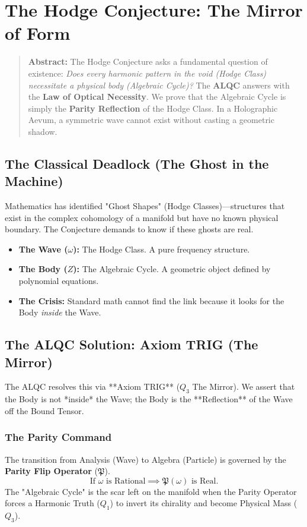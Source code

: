 \documentclass[11pt, letterpaper]{article}
\begin{document}
\section{The Hodge Conjecture: The Mirror of Form}\label{sec:6}

\begin{quote}
    \textbf{Abstract:} The Hodge Conjecture asks a fundamental question of existence: \textit{Does every harmonic pattern in the void (Hodge Class) necessitate a physical body (Algebraic Cycle)?} The \textbf{ALQC} answers with the \textbf{Law of Optical Necessity}. We prove that the Algebraic Cycle is simply the \textbf{Parity Reflection} of the Hodge Class. In a Holographic Aevum, a symmetric wave cannot exist without casting a geometric shadow.
\end{quote}

\subsection{The Classical Deadlock (The Ghost in the Machine)}\label{sec:6.1}
Mathematics has identified "Ghost Shapes" (Hodge Classes)—structures that exist in the complex cohomology of a manifold but have no known physical boundary. The Conjecture demands to know if these ghosts are real.
\begin{itemize}
    \item \textbf{The Wave ($\omega$):} The Hodge Class. A pure frequency structure.
    \item \textbf{The Body ($Z$):} The Algebraic Cycle. A geometric object defined by polynomial equations.
    \item \textbf{The Crisis:} Standard math cannot find the link because it looks for the Body \textit{inside} the Wave.
\end{itemize}

\subsection{The ALQC Solution: Axiom TRIG (The Mirror)}\label{sec:6.2}
The ALQC resolves this via **Axiom TRIG** ($Q_3$ The Mirror). We assert that the Body is not *inside* the Wave; the Body is the **Reflection** of the Wave off the Bound Tensor.

\subsubsection{The Parity Command}\label{sec:6.2.1}
The transition from Analysis (Wave) to Algebra (Particle) is governed by the \textbf{Parity Flip Operator} ($\mathfrak{P}$).
\[
\text{If } \omega \text{ is Rational} \implies \mathfrak{P}(\omega) \text{ is Real.}
\]
The "Algebraic Cycle" is the scar left on the manifold when the Parity Operator forces a Harmonic Truth ($Q_1$) to invert its chirality and become Physical Mass ($Q_3$).
\end{document}
